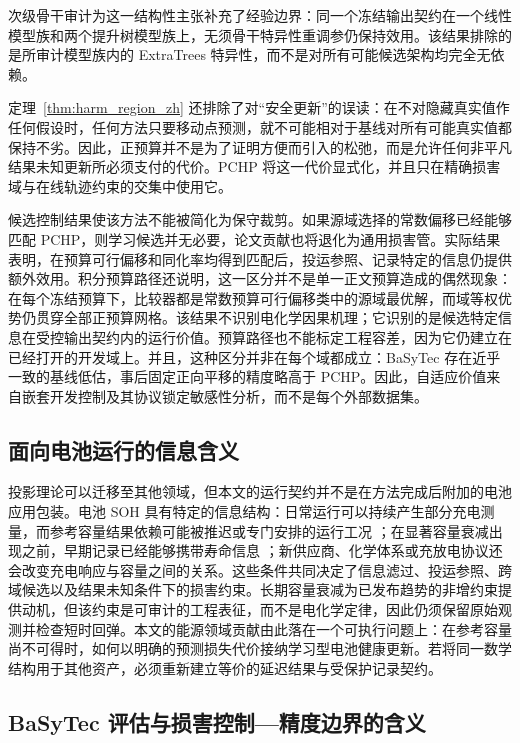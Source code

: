 \documentclass[UTF8,11pt]{ctexart}
\begin{document}
次级骨干审计为这一结构性主张补充了经验边界：同一个冻结输出契约在一个线性模型族和两个提升树模型族上，无须骨干特异性重调参仍保持效用。该结果排除的是所审计模型族内的 ExtraTrees 特异性，而不是对所有可能候选架构均完全无依赖。

定理~\ref{thm:harm_region_zh} 还排除了对“安全更新”的误读：在不对隐藏真实值作任何假设时，任何方法只要移动点预测，就不可能相对于基线对所有可能真实值都保持不劣。因此，正预算并不是为了证明方便而引入的松弛，而是允许任何非平凡结果未知更新所必须支付的代价。PCHP 将这一代价显式化，并且只在精确损害域与在线轨迹约束的交集中使用它。

候选控制结果使该方法不能被简化为保守裁剪。如果源域选择的常数偏移已经能够匹配 PCHP，则学习候选并无必要，论文贡献也将退化为通用损害管。实际结果表明，在预算可行偏移和同化率均得到匹配后，投运参照、记录特定的信息仍提供额外效用。积分预算路径还说明，这一区分并不是单一正文预算造成的偶然现象：在每个冻结预算下，比较器都是常数预算可行偏移类中的源域最优解，而域等权优势仍贯穿全部正预算网格。该结果不识别电化学因果机理；它识别的是候选特定信息在受控输出契约内的运行价值。预算路径也不能标定工程容差，因为它仍建立在已经打开的开发域上。并且，这种区分并非在每个域都成立：BaSyTec 存在近乎一致的基线低估，事后固定正向平移的精度略高于 PCHP。因此，自适应价值来自嵌套开发控制及其协议锁定敏感性分析，而不是每个外部数据集。

\subsection{面向电池运行的信息含义}

投影理论可以迁移至其他领域，但本文的运行契约并不是在方法完成后附加的电池应用包装。电池 SOH 具有特定的信息结构：日常运行可以持续产生部分充电测量，而参考容量结果依赖可能被推迟或专门安排的运行工况 \citep{liu2023rapid,zhang2024flexible}；在显著容量衰减出现之前，早期记录已经能够携带寿命信息 \citep{severson2019cyclelife}；新供应商、化学体系或充放电协议还会改变充电响应与容量之间的关系。这些条件共同决定了信息滤过、投运参照、跨域候选以及结果未知条件下的损害约束。长期容量衰减为已发布趋势的非增约束提供动机，但该约束是可审计的工程表征，而不是电化学定律，因此仍须保留原始观测并检查短时回弹。本文的能源领域贡献由此落在一个可执行问题上：在参考容量尚不可得时，如何以明确的预测损失代价接纳学习型电池健康更新。若将同一数学结构用于其他资产，必须重新建立等价的延迟结果与受保护记录契约。

\subsection{BaSyTec 评估与损害控制—精度边界的含义}
\end{document}
